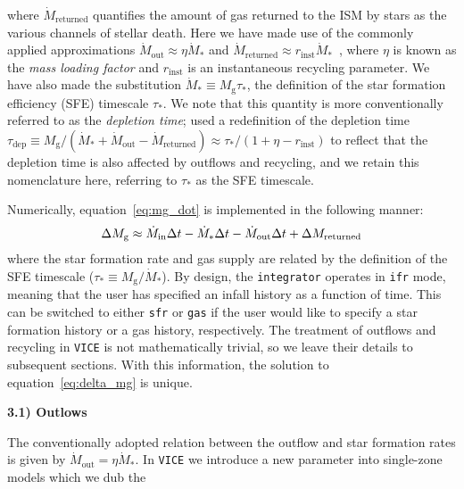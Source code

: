 \documentclass{report}
\begin{document}
where $\dot{M}_\text{returned}$ quantifies the amount of gas returned to the 
ISM by stars as the various channels of stellar death. Here we have made use 
of the commonly applied approximations $\dot{M}_\text{out} \approx 
\eta\dot{M}_*$ and $\dot{M}_\text{returned} \approx r_\text{inst}
\dot{M}_*$~\citep[e.g.][hereafter ]{Weinberg2017}, 
where $\eta$ is known as the \textit{mass loading factor} and $r_\text{inst}$ 
is an instantaneous recycling parameter. We have also made the substitution 
$\dot{M}_* \equiv M_\text{g}\tau_*$, the definition of the star formation 
efficiency (SFE) timescale $\tau_*$. We note that this quantity is more 
conventionally referred to as the \textit{depletion time}; 
 used a redefinition of the depletion time 
$\tau_\text{dep} \equiv M_\text{g}/(\dot{M}_* + \dot{M}_\text{out} - 
\dot{M}_\text{returned}) \approx \tau_*/(1 + \eta - r_\text{inst})$ to reflect 
that the depletion time is also affected by outflows and recycling, and we 
retain this nomenclature here, referring to $\tau_*$ as the SFE timescale. 
\par
Numerically, equation~\ref{eq:mg_dot} is implemented in the following manner: 
\begin{equation}
\label{eq:delta_mg}
\Delta M_\text{g} \approx \dot{M}_\text{in}\Delta t - \dot{M}_*\Delta t - 
\dot{M}_\text{out}\Delta t + \Delta M_\text{returned} \\ 
\end{equation}
where the star formation rate and gas supply are related by the definition of 
the SFE timescale ($\tau_* \equiv M_\text{g}/\dot{M}_*$). By design, the 
\texttt{integrator} operates in \texttt{ifr} mode, meaning that the user has 
specified an infall history as a function of time. This can be switched to 
either \texttt{sfr} or \texttt{gas} if the user would like to specify a 
star formation history or a gas history, respectively. The treatment of 
outflows and recycling in \texttt{VICE} is not mathematically trivial, so we 
leave their details to subsequent sections. With this information, the 
solution to equation~\ref{eq:delta_mg} is unique. 
\par\null\par
\noindent
\hypertarget{sec:outflows}{\textbf{3.1) Outlows}} \par\noindent
The conventionally adopted relation between the outflow and star formation 
rates is given by $\dot{M}_\text{out} = \eta\dot{M}_*$. In \texttt{VICE} we 
introduce a new parameter into single-zone models which we dub the 
\end{document}
